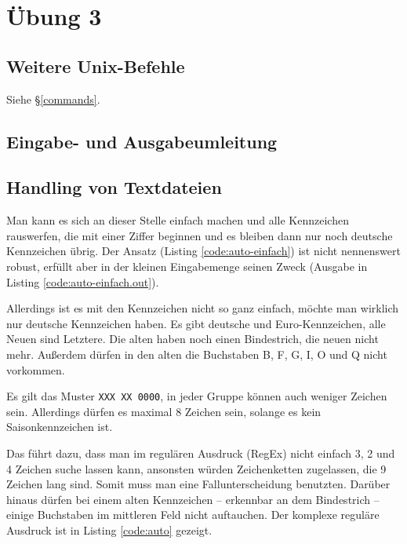 \chapter{Übung 3}

\section{Weitere Unix-Befehle}

Siehe §\ref{commands}.

\section{Eingabe- und Ausgabeumleitung}


\section{Handling von Textdateien}

Man kann es sich an dieser Stelle einfach machen und alle Kennzeichen rauswerfen, die mit einer Ziffer beginnen und es bleiben dann nur noch deutsche Kennzeichen übrig. Der Ansatz (Listing \ref{code:auto-einfach}) ist nicht nennenswert robust, erfüllt aber in der kleinen Eingabemenge seinen Zweck (Ausgabe in Listing \ref{code:auto-einfach.out}).



Allerdings ist es mit den Kennzeichen nicht so ganz einfach, möchte man wirklich nur deutsche Kennzeichen haben. Es gibt deutsche und Euro-Kennzeichen, alle Neuen sind Letztere. Die alten haben noch einen Bindestrich, die neuen nicht mehr. Außerdem dürfen in den alten die Buchstaben B, F, G, I, O und Q nicht vorkommen.\cite{wiki-kfz}

Es gilt das Muster \texttt{XXX XX 0000}, in jeder Gruppe können auch weniger Zeichen sein. Allerdings dürfen es maximal 8 Zeichen sein, solange es kein Saisonkennzeichen ist.

Das führt dazu, dass man im regulären Ausdruck (RegEx) nicht einfach 3, 2 und 4 Zeichen suche lassen kann, ansonsten würden Zeichenketten zugelassen, die 9 Zeichen lang sind. Somit muss man eine Fallunterscheidung benutzten. Darüber hinaus dürfen bei einem alten Kennzeichen -- erkennbar an dem Bindestrich -- einige Buchstaben im mittleren Feld nicht auftauchen. Der komplexe reguläre Ausdruck ist in Listing \ref{code:auto} gezeigt.

